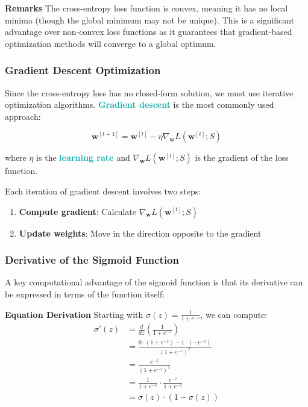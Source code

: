 \documentclass[twoside]{article}
\newcommand{\remarks}[1]{\begin{remarksbox} \textbf{Remarks} \newline #1 \end{remarksbox}}
\newcommand{\derivation}[1]{\begin{derivationbox} \textbf{Equation Derivation} \newline #1 \end{derivationbox}}
\newcommand{\highlightbluetext}[1]{\textcolor[HTML]{09ACA6}{\textbf{#1}}}
\numberwithin{equation}{section}
\begin{document}
	\remarks{The cross-entropy loss function is convex, meaning it has no local minima (though the global minimum may not be unique). This is a significant advantage over non-convex loss functions as it guarantees that gradient-based optimization methods will converge to a global optimum.}

	\subsubsection{Gradient Descent Optimization}
	\label{subsubsec:GradientDescentOptimization}
	Since the cross-entropy loss has no closed-form solution, we must use iterative optimization algorithms. \highlightbluetext{Gradient descent} is the most commonly used approach:

	\begin{equation}
	\label{eq:GradientDescentUpdate}
		\boxed{\mathbf{w}^{[t+1]} = \mathbf{w}^{[t]} - \eta \nabla_{\mathbf{w}} L(\mathbf{w}^{[t]}; S)}
	\end{equation}

	where $\eta$ is the \highlightbluetext{learning rate} and $\nabla_{\mathbf{w}} L(\mathbf{w}^{[t]}; S)$ is the gradient of the loss function.

	Each iteration of gradient descent involves two steps:
	\begin{enumerate}
		\item \textbf{Compute gradient}: Calculate $\nabla_{\mathbf{w}} L(\mathbf{w}^{[t]}; S)$
		\item \textbf{Update weights}: Move in the direction opposite to the gradient
	\end{enumerate}

	\subsubsection{Derivative of the Sigmoid Function}
	\label{subsubsec:DerivativeOfSigmoidFunction}
	A key computational advantage of the sigmoid function is that its derivative can be expressed in terms of the function itself:

	\derivation{
		Starting with $\sigma(z) = \frac{1}{1 + e^{-z}}$, we can compute:
		\begin{align}
			\sigma'(z) &= \frac{d}{dz} \left( \frac{1}{1 + e^{-z}} \right) \\
			&= \frac{0 \cdot (1 + e^{-z}) - 1 \cdot (-e^{-z})}{(1 + e^{-z})^2} \\
			&= \frac{e^{-z}}{(1 + e^{-z})^2} \\
			&= \frac{1}{1 + e^{-z}} \cdot \frac{e^{-z}}{1 + e^{-z}} \\
			&= \sigma(z) \cdot (1 - \sigma(z))
		\end{align}
	}
\end{document}
